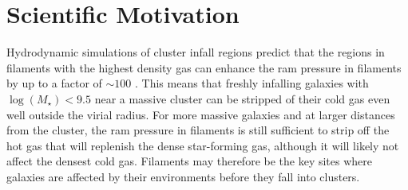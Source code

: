 \documentclass[11pt, preprint]{aastex}
\newcommand{\ha}{H$\alpha$}
\begin{document}
%




\vspace*{-1cm}
\section{Scientific Motivation}
\vspace*{-.4cm}

Hydrodynamic simulations of cluster infall regions predict that
the regions in filaments with the highest density gas can enhance the ram pressure in
filaments by up to a factor of $\sim 100$ \citep{bahe13}.  This 
means that freshly infalling galaxies with $\log(M_\star)<9.5$ near a massive
cluster can be stripped of their cold gas even well outside the virial
radius.  For more massive galaxies and at larger distances from the
cluster, the ram pressure in filaments is still sufficient to strip
off the hot gas that will replenish the dense star-forming gas,
although it will likely not affect the densest cold gas.  
Filaments may therefore be the key
sites where galaxies are affected by their environments before they fall into
clusters.   
\end{document}
